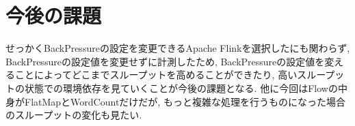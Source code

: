 \documentclass[11pt]{jreport}
\begin{document}
\section{今後の課題}
せっかくBackPressureの設定を変更できるApache Flinkを選択したにも関わらず, BackPressureの設定値を変更せずに計測したため, 
BackPressureの設定値を変えることによってどこまでスループットを高めることができたり, 
高いスループットの状態での環境依存を見ていくことが今後の課題となる.
他に今回はFlowの中身がFlatMapとWordCountだけだが, もっと複雑な処理を行うものになった場合のスループットの変化も見たい.



%
%
%
%
%
\end{document}
